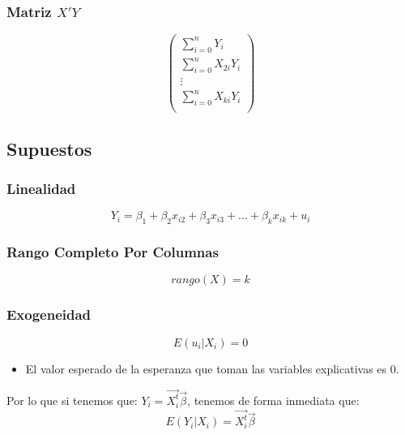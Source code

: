 \documentclass[a4paper,12pt]{article}
\newcommand{\ecuacion}[1]{\ensuremath{#1}}
\begin{document}
\subsubsection*{Matriz \ecuacion{X'Y}}

\begin{equation}
    \begin{pmatrix}
        \sum_{i=0}^n Y_{i} \\
        \sum_{i=0}^n X_{2i}Y_{i} \\
        \vdots \\
        \sum_{i=0}^n X_{ki}Y_{i} \\
    \end{pmatrix}
\end{equation}



\subsection{Supuestos}
\subsubsection{Linealidad}
\begin{equation}
    Y_i = \beta_1 + \beta_2 x_{i2} + \beta_3 x_{i3} + \ldots + \beta_k x_{ik} + u_i
\end{equation}

\subsubsection{Rango Completo Por Columnas}

\begin{equation}
    rango(X) = k
\end{equation}

\subsubsection{Exogeneidad}
\begin{equation}
    E(u_i|X_i) = 0
\end{equation}
\begin{itemize}
    \item El valor esperado de la esperanza que toman las variables explicativas es 0.
\end{itemize}

Por lo que si tenemos que: $Y_i = \vec{X_i^{t}}\vec{\beta}$, tenemos de forma inmediata que:
\begin{equation}
    E(Y_i|X_i) = \vec{X_i^{t}}\vec{\beta}
\end{equation}
\end{document}
